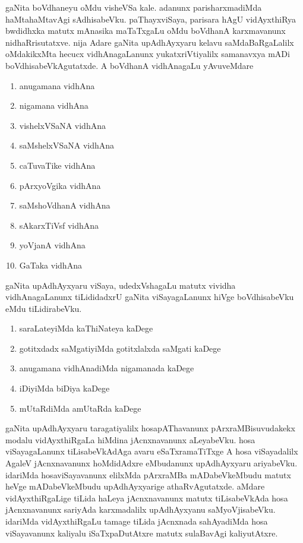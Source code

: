 gaNita boVdhaneyu oMdu visheVSa kale. adanunx parisharxmadiMda haMtahaMtavAgi sAdhisabeVku. paThayxviSaya,  parisara hAgU vidAyxthiRya bwdidhxka matutx mAnasika maTaTxgaLu oMdu boVdhanA karxmavanunx nidhaRrisutatxve. nija Adare gaNita upAdhAyxyaru kelavu saMdaBaRgaLalilx oMdakikxMta hecucx vidhAnagaLanunx yukatxriVtiyalilx samanavxya mADi boVdhisabeVkAgutatxde. A boVdhanA vidhAnagaLu yAvuveMdare
\begin{enumerate}[{\rm 1.}]
\item anugamana vidhAna
\item nigamana vidhAna
\item vishelxVSaNA vidhAna
\item saMshelxVSaNA vidhAna
\item caTuvaTike vidhAna
\item pArxyoVgika vidhAna
\item saMshoVdhanA vidhAna
\item sAkarxTiVsf vidhAna
\item yoVjanA vidhAna
\item GaTaka vidhAna
\end{enumerate}

gaNita upAdhAyxyaru viSaya, udedxVshagaLu matutx vividha vidhAnagaLanunx tiLididadxrU gaNita viSayagaLanunx hiVge boVdhisabeVku eMdu tiLidirabeVku.
\begin{enumerate}[{\rm 1.}]
\item saraLateyiMda kaThiNateya kaDege
\item gotitxdadx saMgatiyiMda gotitxlalxda saMgati kaDege
\item anugamana vidhAnadiMda nigamanada kaDege
\item iDiyiMda biDiya kaDege
\item mUtaRdiMda amUtaRda kaDege
\end{enumerate}

gaNita upAdhAyxyaru taragatiyalilx hosapAThavanunx pArxraMBisuvudakekx modalu vidAyxthiRgaLa hiMdina jAcnxnavanunx aLeyabeVku. hosa viSayagaLanunx tiLisabeVkAdAga avaru eSaTxramaTiTxge A hosa viSayadalilx AgaleV jAcnxnavanunx hoMdidAdxre eMbudanunx upAdhAyxyaru ariyabeVku. idariMda hosaviSayavanunx elilxMda pArxraMBa mADabeVkeMbudu matutx heVge mADabeVkeMbudu upAdhAyxyarige athaRvAgutatxde. aMdare vidAyxthiRgaLige tiLida haLeya jAcnxnavanunx matutx tiLisabeVkAda hosa jAcnxnavanunx sariyAda karxmadalilx upAdhAyxyanu saMyoVjisabeVku. idariMda vidAyxthiRgaLu tamage tiLida jAcnxnada sahAyadiMda hosa viSayavanunx kaliyalu iSaTxpaDutAtxre matutx sulaBavAgi kaliyutAtxre.

